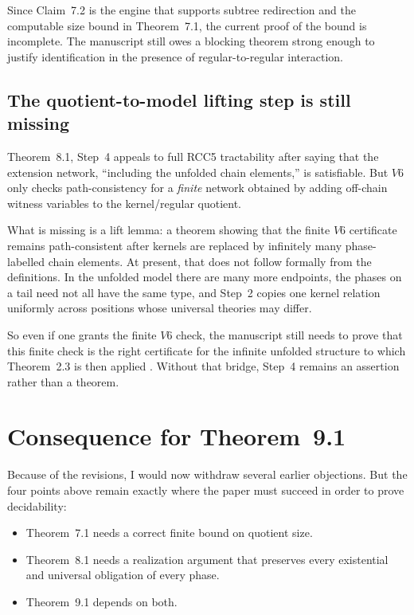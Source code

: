 \documentclass[11pt]{article}
\begin{document}
Since Claim~7.2 is the engine that supports subtree redirection and the computable size bound in Theorem~7.1, the current proof of the bound is incomplete. The manuscript still owes a blocking theorem strong enough to justify identification in the presence of regular-to-regular interaction.

\subsection{The quotient-to-model lifting step is still missing}

Theorem~8.1, Step~4 appeals to full RCC5 tractability after saying that the extension network, ``including the unfolded chain elements,'' is satisfiable. But $V6$ only checks path-consistency for a \emph{finite} network obtained by adding off-chain witness variables to the kernel/regular quotient.

What is missing is a lift lemma: a theorem showing that the finite $V6$ certificate remains path-consistent after kernels are replaced by infinitely many phase-labelled chain elements. At present, that does not follow formally from the definitions. In the unfolded model there are many more endpoints, the phases on a tail need not all have the same type, and Step~2 copies one kernel relation uniformly across positions whose universal theories may differ.

So even if one grants the finite $V6$ check, the manuscript still needs to prove that this finite check is the right certificate for the infinite unfolded structure to which Theorem~2.3 is then applied \cite{RenzNebel1999}. Without that bridge, Step~4 remains an assertion rather than a theorem.

\section{Consequence for Theorem~9.1}

Because of the revisions, I would now withdraw several earlier objections. But the four points above remain exactly where the paper must succeed in order to prove decidability:
\begin{itemize}
  \item Theorem~7.1 needs a correct finite bound on quotient size.
  \item Theorem~8.1 needs a realization argument that preserves every existential and universal obligation of every phase.
  \item Theorem~9.1 depends on both.
\end{itemize}
\end{document}

